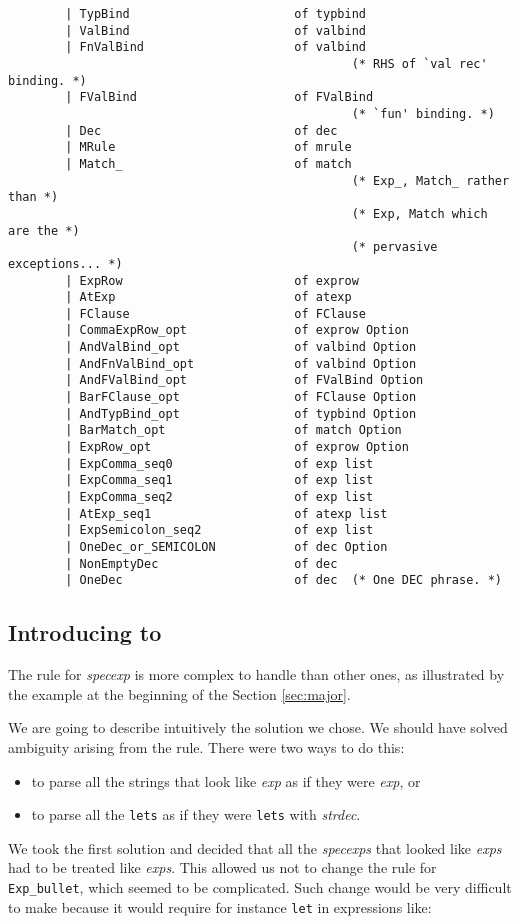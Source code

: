 {\small
\begin{verbatim}
        | TypBind                       of typbind
        | ValBind                       of valbind
        | FnValBind                     of valbind
                                                (* RHS of `val rec' binding. *)
        | FValBind                      of FValBind
                                                (* `fun' binding. *)
        | Dec                           of dec
        | MRule                         of mrule
        | Match_                        of match
                                                (* Exp_, Match_ rather than *)
                                                (* Exp, Match which are the *)
                                                (* pervasive exceptions... *)
        | ExpRow                        of exprow
        | AtExp                         of atexp
        | FClause                       of FClause
        | CommaExpRow_opt               of exprow Option
        | AndValBind_opt                of valbind Option
        | AndFnValBind_opt              of valbind Option
        | AndFValBind_opt               of FValBind Option
        | BarFClause_opt                of FClause Option
        | AndTypBind_opt                of typbind Option
        | BarMatch_opt                  of match Option
        | ExpRow_opt                    of exprow Option
        | ExpComma_seq0                 of exp list
        | ExpComma_seq1                 of exp list
        | ExpComma_seq2                 of exp list
        | AtExp_seq1                    of atexp list
        | ExpSemicolon_seq2             of exp list
        | OneDec_or_SEMICOLON           of dec Option
        | NonEmptyDec                   of dec
        | OneDec                        of dec  (* One DEC phrase. *)
\end{verbatim}}


\subsection{Introducing  to }
\label{sec:specexp}

The rule for {\it specexp} is more complex to handle than other ones,
as illustrated by the example at the beginning of the Section
\ref{sec:major}.

We are going to describe intuitively the solution we chose. We should
have solved ambiguity arising from the rule. There were two ways to
do this:
\begin{itemize}
\item to parse all the strings that look like {\it exp} as if they were
  {\it exp}, or
\item to parse all the {\tt lets} as if they were {\tt lets} with
  {\it strdec}.
\end{itemize}
We took the first solution and decided that all the {\it specexps}
  that looked like {\it exps} had to be treated like {\it exps}. This
  allowed us not to change the rule for {\tt Exp\_bullet}, which
  seemed to be complicated.  Such change would be very difficult to
  make because it would require for instance {\tt let} in expressions
  like:

